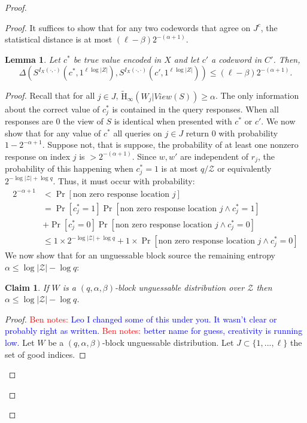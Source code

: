 \documentclass[11pt]{article}
\newcommand{\Hav}{\tilde{\mathrm{H}}_\infty}
\newtheorem{lemma}[theorem]{Lemma}
\newtheorem{claim}[theorem]{Claim}
\newcommand{\authnote}[2]{{\textcolor{red}{\textsf{#1 notes: }\textcolor{blue}{ #2}}\marginpar{\textcolor{red}{\textbf{!!!!!}}}}}
\newcommand{\authnote}[2]{}
\newcommand{\bnote}[1]{{\authnote{Ben}{#1}}}
\begin{document}
\begin{proof}
\begin{proof}
\noindent It suffices to show that for any two codewords that agree on $J^c$, the statistical distance is at most $(\ell-\beta)2^{-(\alpha+1)}$.
\begin{lemma}
\label{lem:codewords in I close}
Let $c^*$ be true value encoded in $X$ and let $c'$ a codeword in $C'$.  Then,
\[
\Delta( S^{I_X(\cdot, \cdot)}(c^*, 1^{\ell \log |Z|}), S^{I_X(\cdot, \cdot)}(c', 1^{\ell \log |Z|})) \le ( \ell -\beta) 2^{-(\alpha+1)}.
\]
\end{lemma}
\begin{proof}
Recall that for all $j\in J$, $\Hav(W_j | View(S))\geq \alpha$.  The only information about the correct value of $c_j^*$ is contained in the query responses.  When all responses are $0$ the view of $S$ is identical when presented with $c^*$ or $c'$.  We now show that for any value of $c^*$ all queries on $j \in J$ return $0$ with probability $1-2^{-\alpha+1}$.  Suppose not, that is suppose, the probability of at least one nonzero response on index $j$ is $> 2^{-(\alpha+1)}$.  Since $w, w'$ are independent of $r_j$, the probability of this happening when $c^*_j = 1$ is at most $q/\mathcal{Z}$ or  equivalently $2^{-\log |\mathcal{Z}|+\log q}$.  Thus, it must occur with probability:
\begin{align}
2^{-\alpha+1}&<\Pr[\text{non zero response location }j]\nonumber \\
 &= \Pr[c_j^* =1]\Pr[\text{non zero response location }j\wedge c_j^*=1]\nonumber \\&+ \Pr[c_j^*=0] \Pr[\text{non zero response location }j \wedge c_j^*=0]\nonumber \\
&\le 1\times 2^{-\log|\mathcal{Z}|+\log q} + 1\times  \Pr[\text{non zero response location }j \wedge c_j^*=0] \label{eq:ways to remove ent}
\end{align}
We now show that for an unguessable block source the remaining entropy $\alpha\leq \log |\mathcal{Z}|-\log q $:
\begin{claim}
\label{cl:ent bounded away from n}
If $W$ is a $(q, \alpha, \beta)$-block unguessable distribution over $\mathcal{Z}$ then $\alpha \le \log |\mathcal{Z}|-\log q$.
\end{claim}
\begin{proof}
\bnote{Leo I changed some of this under you.  It wasn't clear or probably right as written.}
\bnote{better name for guess, creativity is running low.}
Let $W$ be a $(q, \alpha, \beta)$-block unguessable distribution.  Let $J\subset\{1,..., \ell\}$ the set of good indices.

\end{proof}
\end{proof}
\end{proof}
\end{proof}
\end{document}
